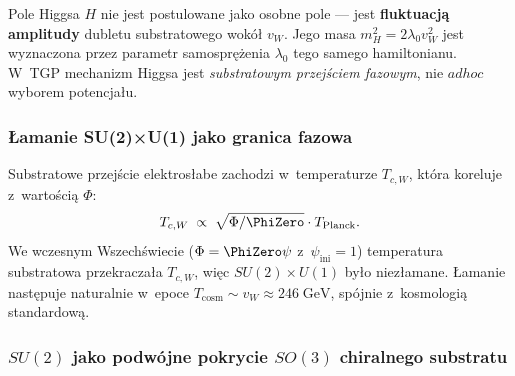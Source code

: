 \begin{remark}%
\label{rem:higgs-substrate}
Pole Higgsa $H$ nie jest postulowane jako osobne pole ---
jest \textbf{fluktuacją amplitudy} dubletu substratowego
wokół $v_W$. Jego masa $m_H^2 = 2\lambda_0 v_W^2$
jest wyznaczona przez parametr samosprężenia $\lambda_0$
tego samego hamiltonianu. W~TGP mechanizm Higgsa
jest \emph{substratowym przejściem fazowym}, nie $ad hoc$
wyborem potencjału.
\end{remark}

\subsubsection{Łamanie SU(2)×U(1) jako granica fazowa}

\begin{proposition}\label{prop:EW-phase}
Substratowe przejście elektrosłabe zachodzi w~temperaturze $T_{c,W}$,
która koreluje z~wartością $\Phi$:
\begin{equation}\label{eq:EW-Phi-corr}
    T_{c,W} \;\propto\; \sqrt{\Phi / \PhiZero} \cdot T_{\mathrm{Planck}}.
\end{equation}
We wczesnym Wszechświecie ($\Phi = \PhiZero\psi$ z~$\psi_{\mathrm{ini}} = 1$)
temperatura substratowa przekraczała $T_{c,W}$, więc $SU(2) \times U(1)$
było niezłamane. Łamanie następuje naturalnie w~epoce
$T_{\mathrm{cosm}} \sim v_W \approx 246\;\mathrm{GeV}$,
spójnie z~kosmologią standardową.
\end{proposition}

\subsubsection{$SU(2)$ jako podw\'ojne pokrycie $SO(3)$
  chiralnego substratu}\label{sssec:su2-chiral}


